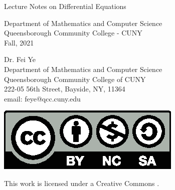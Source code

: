 
\begin{titlepage}
	\thispagestyle{empty}%

	\begin{center}
		\bfseries
		\vspace*{2\baselineskip}
		{\huge\raggedright \color{main} Lecture Notes on Differential Equations \par}
		{\LARGE\raggedleft \color{third}{Fei Ye}\par}%
	\end{center}%
	\vspace*{10\baselineskip}
	\vfill
	\color{second}
	\begin{center}
		{
		\large\color{second}
		Department of Mathematics and Computer Science\\[1ex]
		Queensborough Community College - CUNY\\[3ex]
		}
		{\cyan
		 Fall, 2021%
		}
	\end{center}

	\vspace*{1\baselineskip}

\end{titlepage}

\thispagestyle{empty}

\vspace*{2\baselineskip}


\begin{flushleft}
  Dr. Fei Ye\\
  Department of Mathematics and Computer Science\\
  Queensborough Community College of CUNY\\
  222-05 56th Street, Bayside, NY, 11364\\
  email: feye@qcc.cuny.edu

  \null\vfill








  \includegraphics{pics/by-nc-sa.eps}

  This work is licensed under a Creative Commons
  \href{https://creativecommons.org/licenses/by-nc-sa/4.0/}{}.

\end{flushleft}

\newpage
